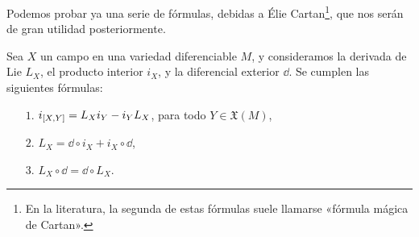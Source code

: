 Podemos probar ya una serie de fórmulas, debidas a Élie Cartan\footnote{En la literatura, la segunda de estas fórmulas suele llamarse «fórmula mágica de Cartan».}, que nos serán de gran utilidad posteriormente.
\begin{thm}
  Sea $X$ un campo en una variedad diferenciable $M$, y consideramos la derivada de Lie $L_X$, el producto interior $i_X$, y la diferencial exterior $\dd$. Se cumplen las siguientes fórmulas:
  \begin{enumerate}
    \item[$1$.] $i_{\left[X,Y\right]}=L_X i_Y - i_Y L_X$, para todo $Y \in \mathfrak{X}(M)$,
    \item[$2$.] $L_X= \dd \circ i_X + i_X \circ \dd $,
    \item[$3$.] $L_X\circ \dd = \dd \circ L_X$.
  \end{enumerate}
\end{thm}

